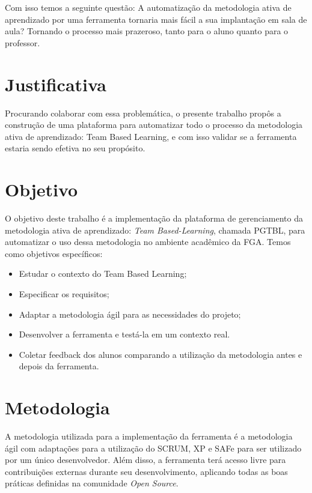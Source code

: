 Com isso temos a seguinte questão: A automatização da metodologia ativa de aprendizado por uma ferramenta tornaria mais fácil a sua implantação em sala de aula? Tornando o processo mais prazeroso, tanto para o aluno quanto para o professor.

\section{Justificativa}

Procurando colaborar com essa problemática, o presente trabalho propôs a construção de uma plataforma para automatizar todo o processo da metodologia ativa de aprendizado: Team Based Learning, e com isso validar se a ferramenta estaria sendo efetiva no seu propósito.

\section{Objetivo}

O objetivo deste trabalho é a implementação da plataforma de gerenciamento da metodologia ativa de aprendizado: \textit{Team Based-Learning}, chamada PGTBL, para automatizar o uso dessa metodologia no ambiente acadêmico da FGA. Temos como objetivos específicos:

\begin{itemize}
  \item Estudar o contexto do Team Based Learning;
  \item Especificar os requisitos;
  \item Adaptar a metodologia ágil para as necessidades do projeto;
  \item Desenvolver a ferramenta e testá-la em um contexto real.
  \item Coletar feedback dos alunos comparando a utilização da metodologia antes e depois da ferramenta.
\end{itemize}

\section{Metodologia}

A metodologia utilizada para a implementação da ferramenta é a metodologia ágil com adaptações para a utilização do SCRUM, XP e SAFe para ser utilizado por um único desenvolvedor. Além disso, a ferramenta terá acesso livre para contribuições externas durante seu desenvolvimento, aplicando todas as boas práticas definidas na comunidade \textit{Open Source}.

